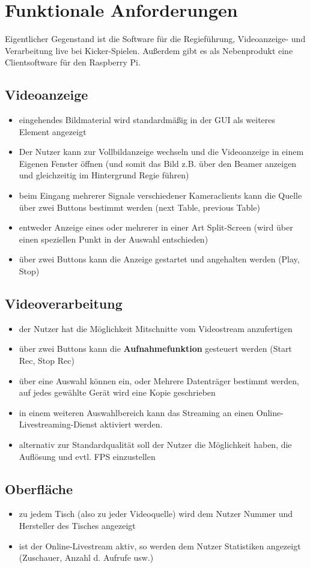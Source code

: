 \documentclass[10pt,a4paper,notitlepage]{article}
\author{Felix Lüpke}
\begin{document}
\section{Funktionale Anforderungen}
Eigentlicher Gegenstand ist die Software für die Regieführung, Videoanzeige- und Verarbeitung live bei Kicker-Spielen. Außerdem gibt es als Nebenprodukt eine Clientsoftware für den Raspberry Pi.
\subsection{Videoanzeige}
\begin{itemize}
\item eingehendes Bildmaterial wird standardmäßig in der GUI als weiteres Element angezeigt
\item Der Nutzer kann zur Vollbildanzeige wechseln und die Videoanzeige in einem Eigenen Fenster öffnen (und somit das Bild z.B. über den Beamer anzeigen und gleichzeitig im Hintergrund Regie führen)
\item beim Eingang mehrerer Signale verschiedener Kameraclients kann die Quelle über zwei Buttons bestimmt werden (next Table, previous Table)
\item entweder Anzeige eines oder mehrerer in einer Art Split-Screen (wird über einen speziellen Punkt in der Auswahl entschieden)
\item über zwei Buttons kann die Anzeige gestartet und angehalten werden (Play, Stop)
\end{itemize}
\subsection{Videoverarbeitung}
\begin{itemize}
\item der Nutzer hat die Möglichkeit Mitschnitte vom Videostream anzufertigen 
\item über zwei Buttons kann die \textbf{Aufnahmefunktion} gesteuert werden (Start Rec, Stop Rec)
\item über eine Auswahl können ein, oder Mehrere Datenträger bestimmt werden, auf jedes gewählte Gerät wird eine Kopie geschrieben
\item in einem weiteren Auswahlbereich kann das Streaming an einen Online-Livestreaming-Dienst aktiviert werden. 
\item alternativ zur Standardqualität soll der Nutzer die Möglichkeit haben, die Auflösung und evtl. FPS einzustellen
\end{itemize}
\subsection{Oberfläche}
\begin{itemize}
\item zu jedem Tisch (also zu jeder Videoquelle) wird dem Nutzer Nummer und Hersteller des Tisches angezeigt
\item ist der Online-Livestream aktiv, so werden dem Nutzer Statistiken angezeigt (Zuschauer, Anzahl d. Aufrufe usw.)
\end{itemize}
\end{document}
